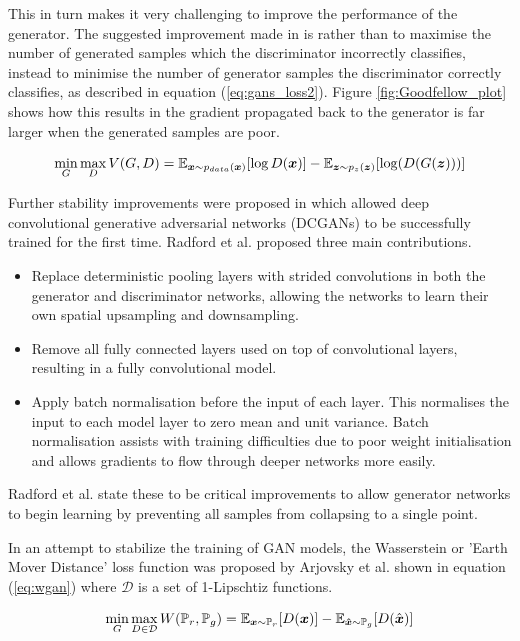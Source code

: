 This in turn makes it very challenging to improve the performance of the generator.
The suggested improvement made in \cite{Goodfellow2014} is rather than to maximise the number of generated samples which the discriminator incorrectly classifies, instead to minimise the number of generator samples the discriminator correctly classifies, as described in equation (\ref{eq:gans_loss2}).
Figure \ref{fig:Goodfellow_plot} shows how this results in the gradient propagated back to the generator is far larger when the generated samples are poor.

\begin{equation} \label{eq:gans_loss2}
    \min_{G} \max_{D} V(G, D) = \mathbb{E}_{{\boldsymbol{{x}}} \sim p_{data}({\boldsymbol{{x}}})} [\log D({\boldsymbol{{x}}})]
                              - \mathbb{E}_{{\boldsymbol{{z}}} \sim p_{z}({\boldsymbol{{z}}})} [\log (D(G({\boldsymbol{{z}}})))]
\end{equation}
\quad

Further stability improvements were proposed in \cite{Radford2016} which allowed deep convolutional generative adversarial networks (DCGANs) to be successfully trained for the first time.
Radford et al. proposed three main contributions.
\begin{itemize}
    \item Replace deterministic pooling layers with strided convolutions in both the generator and discriminator networks, allowing the networks to learn their own spatial upsampling and downsampling.
    \item Remove all fully connected layers used on top of convolutional layers, resulting in a fully convolutional model.
    \item Apply batch normalisation \cite{Ioffe2015} before the input of each layer.
    This normalises the input to each model layer to zero mean and unit variance.
    Batch normalisation assists with training difficulties due to poor weight initialisation and allows gradients to flow through deeper networks more easily.
\end{itemize}
Radford et al. state these to be critical improvements to allow generator networks to begin learning by preventing all samples from collapsing to a single point. 

In an attempt to stabilize the training of GAN models, the Wasserstein or 'Earth Mover Distance' loss function was proposed by Arjovsky et al. \cite{Arjovsky2017} shown in equation (\ref{eq:wgan}) where $\mathcal{D}$ is a set of 1-Lipschtiz functions.

\begin{equation} \label{eq:wgan}
    \min_{G} \max_{D \in \mathcal{D}} W(\mathbb{P}_{r}, \mathbb{P}_{g}) =
            \mathbb{E}_{{\boldsymbol{{x}}} \sim \mathbb{P}_{r}} [D({\boldsymbol{{x}}})]
            -\mathbb{E}_{{\boldsymbol{{\hat{x}}}} \sim \mathbb{P}_{g}} [D(\hat{{\boldsymbol{{x}}}})]
\end{equation}
\quad

